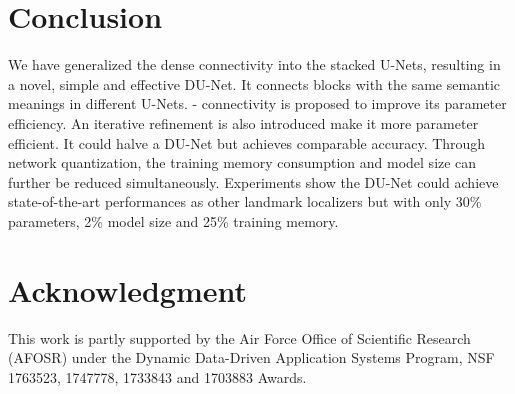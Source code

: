\documentclass[runningheads]{llncs}
\begin{document}
 \section{Conclusion}
We have generalized the dense connectivity into the stacked U-Nets, resulting in a novel, simple and effective DU-Net. It connects blocks with the same semantic meanings in different U-Nets. - connectivity is proposed to improve its parameter efficiency. An iterative refinement is also introduced make it more parameter efficient. It could halve a DU-Net but achieves comparable accuracy.
Through network quantization, the training memory consumption and model size can further be reduced simultaneously.
Experiments show the DU-Net could achieve state-of-the-art performances as other landmark localizers but with only  30\% parameters, 2\% model size and 25\% training memory. \section{Acknowledgment}
This work is partly supported by the Air Force Office of Scientific Research (AFOSR) under the Dynamic Data-Driven Application Systems Program, NSF 1763523, 1747778, 1733843 and 1703883 Awards. 
\clearpage



\end{document}
